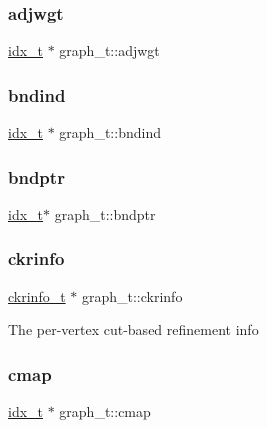 \subsubsection{\texorpdfstring{adjwgt}{adjwgt}}
{\footnotesize\ttfamily \hyperlink{a00876_aaa5262be3e700770163401acb0150f52}{idx\+\_\+t} $\ast$ graph\+\_\+t\+::adjwgt}

\mbox{\label{a00734_ad420de5e214ec5fb52b9b2e2ff7bde43}} 
\subsubsection{\texorpdfstring{bndind}{bndind}}
{\footnotesize\ttfamily \hyperlink{a00876_aaa5262be3e700770163401acb0150f52}{idx\+\_\+t} $\ast$ graph\+\_\+t\+::bndind}

\mbox{\label{a00734_a887f84b3a4cf1be7bda92502ec02f294}} 
\subsubsection{\texorpdfstring{bndptr}{bndptr}}
{\footnotesize\ttfamily \hyperlink{a00876_aaa5262be3e700770163401acb0150f52}{idx\+\_\+t}$\ast$ graph\+\_\+t\+::bndptr}

\mbox{\label{a00734_a96ce794391175ad22d2bfd9adc0dce27}} 
\subsubsection{\texorpdfstring{ckrinfo}{ckrinfo}}
{\footnotesize\ttfamily \hyperlink{a00718}{ckrinfo\+\_\+t} $\ast$ graph\+\_\+t\+::ckrinfo}

The per-\/vertex cut-\/based refinement info \mbox{\label{a00734_a7f6d2c556b08aa7a33d55374e0a60c7f}} 
\subsubsection{\texorpdfstring{cmap}{cmap}}
{\footnotesize\ttfamily \hyperlink{a00876_aaa5262be3e700770163401acb0150f52}{idx\+\_\+t} $\ast$ graph\+\_\+t\+::cmap}

